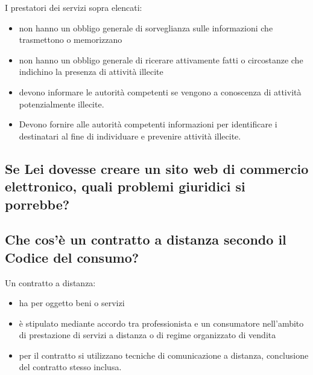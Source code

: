 \newline
I prestatori dei servizi sopra elencati:
\begin{itemize}
    \item non hanno un obbligo generale di sorveglianza sulle informazioni che trasmettono o memorizzano
    \item non hanno un obbligo generale di ricerare attivamente fatti o circostanze che indichino la presenza di attività illecite
    \item devono informare le autorità competenti se vengono a conoscenza di attività potenzialmente illecite.
    \item Devono fornire alle autorità competenti informazioni per identificare i destinatari al fine di individuare e prevenire attività illecite.
\end{itemize}

\subsection{Se Lei dovesse creare un sito web di commercio elettronico, quali problemi giuridici si porrebbe?}

\subsection{Che cos’è un contratto a distanza secondo il Codice del consumo?}
Un contratto a distanza:
\begin{itemize}
    \item ha per oggetto beni o servizi
    \item è stipulato mediante accordo tra professionista e un consumatore nell'ambito di prestazione di servizi a distanza o di regime organizzato di vendita
    \item per il contratto si utilizzano tecniche di comunicazione a distanza, conclusione del contratto stesso inclusa.
\end{itemize}

